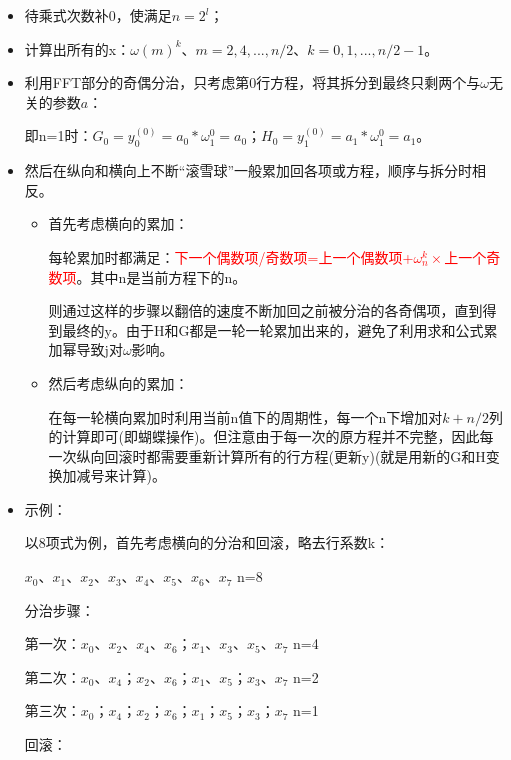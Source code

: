 \documentclass[UTF8]{article}%
\begin{document}
\begin{itemize}
    \item 待乘式次数补0，使满足$n=2^l$；
    \item 计算出所有的x：$\omega(m)^k$、$m=2,4,...,n/2$、$k=0,1,...,n/2-1$。
    \item 利用FFT部分的奇偶分治，只考虑第0行方程，将其拆分到最终只剩两个与$\omega$无关的参数$a$：
    
    即n=1时：$G_0=y_0^{(0)}=a_0*\omega_1^0=a_0$；$H_0=y_1^{(0)}=a_1*\omega_1^0=a_1$。

    \item 然后在纵向和横向上不断“滚雪球”一般累加回各项或方程，顺序与拆分时相反。
    
    {
        \begin{itemize}
            \item 首先考虑横向的累加：
            
            每轮累加时都满足：\textcolor{red}{下一个偶数项/奇数项=上一个偶数项+$\omega_n^k×$上一个奇数项}。其中n是当前方程下的n。
            
            则通过这样的步骤以翻倍的速度不断加回之前被分治的各奇偶项，直到得到最终的y。由于H和G都是一轮一轮累加出来的，避免了利用求和公式累加幂导致j对$\omega$影响。

            \item 然后考虑纵向的累加：
            
            在每一轮横向累加时利用当前n值下的周期性，每一个n下增加对$k+n/2$列的计算即可(即蝴蝶操作)。但注意由于每一次的原方程并不完整，因此每一次纵向回滚时都需要重新计算所有的行方程(更新y)(就是用新的G和H变换加减号来计算)。

        \end{itemize}
    }            
    
    \item 示例：
    
    以8项式为例，首先考虑横向的分治和回滚，略去行系数k：
    
    $x_0$、$x_1$、$x_2$、$x_3$、$x_4$、$x_5$、$x_6$、$x_7$ \qquad n=8
    
    分治步骤：

    第一次：$x_0$、$x_2$、$x_4$、$x_6$；$x_1$、$x_3$、$x_5$、$x_7$ \qquad n=4

    第二次：$x_0$、$x_4$；$x_2$、$x_6$；$x_1$、$x_5$；$x_3$、$x_7$ \qquad n=2

    第三次：$x_0$；$x_4$；$x_2$；$x_6$；$x_1$；$x_5$；$x_3$；$x_7$ \qquad n=1

    回滚：


\end{itemize}
\end{document}
